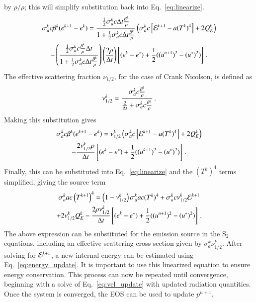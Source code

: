 by $\rho/\rho$; this will simplify substitution back into
Eq.~\eqref{eq:linearize}.
\begin{multline}
    \sigma_a^k c \beta^k (e^{k+1} - e^k) = \frac{\frac{1}{2}\sigma_a^k c \Delta t
    \frac{\beta^k}{\rho}}{1+\frac{1}{2}\sigma_a^k c \Delta t \frac{\beta^k}{\rho}}
    \left(\sigma_a^k c\left[\mathcal{E}^{k+1} - a (T^k)^4\right] + 2Q_E^k\right)\\
    - \left(\frac{\frac{1}{2}\sigma_a^k c \frac{\beta^k}{\rho} \Delta t}
    {1 +\frac{1}{2}\sigma_a^k c \Delta t \frac{\beta^k}{\rho}}\right)
    \left(\frac{2\rho}{\Delta t}\right)\left[(e^k - e^*)
    + \frac{1}{2}((u^{n+1})^2 - (u^*)^2)\right] \, .
 \end{multline}
The effective scattering fraction $\nu_{1/2}$, for the case of Crank Nicolson, is
defined as
\begin{equation}
    \nu_{1/2}^k = \frac{\sigma_a^k c \frac{\beta^k}{\rho}}{\frac{2}{\Delta t}+ \sigma_a^k c
    \frac{\beta^k}{\rho}  } \, .
\end{equation}
Making this substitution gives
\begin{multline*}
    \sigma_a^k c \beta^k(e^{k+1} - e^k) = \nu_{1/2}^k \left(\sigma_a^k c
    \left[\mathcal{E}^{k+1} - a (T^k)^4\right] + 2Q_E^k\right)\\
    -\frac{2\nu_{1/2}^k\rho}{\Delta t} \left[(e^k - e^*)
    + \frac{1}{2}((u^{k+1})^2 - (u^*)^2)\right] \, .
\end{multline*}
Finally, this can be substituted into Eq.~\eqref{eq:linearize} and the $(T^k)^4$
terms simplified, giving the source term
\begin{multline}
   \sigma_a^k a c\left(T^{k+1}\right)^4 = \left(1 - \nu_{1/2}^k\right)
   \sigma_a^k a c (T^k)^4 + \sigma_a^k c \nu_{1/2}^k \mathcal{E}^{k+1}\\
   +2\nu_{1/2}^k Q_E^k - \frac{2\rho\nu_{1/2}^k}{\Delta t}
   \left[(e^k - e^*) + \frac{1}{2}((u^{n+1})^2 - (u^*)^2)\right] \, .
\end{multline}
The above expression can be substituted for the emission source in the S$_2$
equations, including an effective scattering cross section given by $\sigma_a^k
\nu_{1/2}^k$.  After solving for $\mathcal{E}^{k+1}$, a new internal energy can be estimated
using Eq.~\eqref{eq:energy_update}. It is important to use this linearized
equation to ensure energy conservation.  This process can now be repeated until
convergence, beginning with a solve of Eq.~\eqref{eq:vel_update} with updated
radiation quantities.  Once the system is converged, the EOS can be used to
update $p^{n+1}$.

